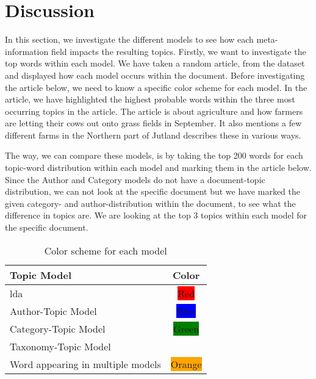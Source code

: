\section{Discussion}\label{sec:discussion}
In this section, we investigate the different models to see how each meta-information field impacts the resulting topics.
Firstly, we want to investigate the top words within each model.
We have taken a random article, from the dataset and displayed how each model occurs within the document. 
Before investigating the article below, we need to know a specific color scheme for each model.
In the article, we have highlighted the highest probable words within the three most occurring topics in the article.
The article is about agriculture and how farmers are letting their cows out onto grass fields in September. 
It also mentions a few different farms in the Northern part of Jutland describes these in various ways.

The way, we can compare these models, is by taking the top 200 words for each topic-word distribution within each model and marking them in the article below.
Since the Author and Category models do not have a document-topic distribution, we can not look at the specific document but we have marked the given category- and author-distribution within the document, to see what the difference in topics are.
We are looking at the top 3 topics within each model for the specific document.


\begin{table}[h]
	\centering
	\caption{Color scheme for each model}
	\begin{tabular}{l|c}
		Topic Model & Color \\
		\midrule
		\Acrlong{lda} & \colorbox{red}{Red} \\
		Author-Topic Model & \colorbox{blue}{Blue} \\
		Category-Topic Model & \colorbox{green}{Green} \\
		Taxonomy-Topic Model & \\
		Word appearing in multiple models & \colorbox{orange}{Orange}  \\
	\end{tabular}
	\label{tab:disc_color}
\end{table}

